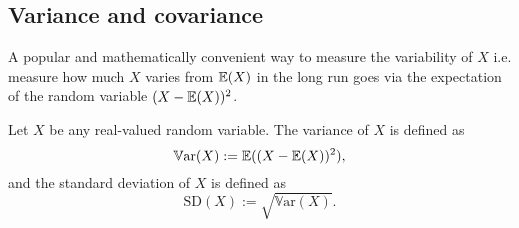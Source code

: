 \documentclass[10pt, a4paper]{article}
\begin{document}
\subsection{Variance and covariance}
A popular and mathematically convenient way to measure the variability of $X$ i.e. measure how much $X$ varies from $\mathbb{E}(X)$ in the long run goes via the expectation of the random variable $(X - \mathbb{E}(X)) ^ 2$.

\begin{definition}
    Let $X$ be any real-valued random variable.
    The variance of $X$ is defined as
    \[
    \mathbb{V}\mathrm{ar}(X) := \mathbb{E}((X - \mathbb{E}(X)) ^ 2),
    \]
    and the standard deviation of $X$ is defined as
    \[
    \mathrm{SD}(X) := \sqrt{\mathbb{V}\mathrm{ar}(X)}.
    \]
\end{definition}
\end{document}
